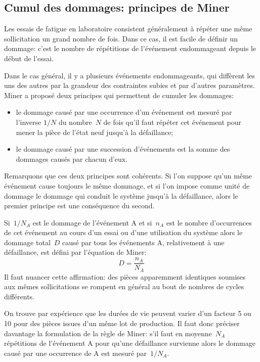 \medskip
\subsection{Cumul des dommages: principes de Miner}

\medskip
Les essais de fatigue en laboratoire consistent généralement à répéter une même
sollicitation un grand nombre de fois. Dans ce cas, il est facile de définir un dommage: c'est
le nombre de répétitions de l'événement endommageant depuis le début de l'essai.

Dans le cas général, il y a plusieurs événements endommageants, qui diffèrent les uns
des autres par la grandeur des contraintes subies et par d'autres paramètres. Miner a proposé
deux principes qui permettent de cumuler les dommages:
\begin{itemize}
  \item le dommage causé par une occurrence d'un événement est mesuré par l'inverse
	$1/N$ du nombre~$N$ de fois qu'il faut répéter cet événement pour mener la pièce de
	l'état neuf jusqu'à la défaillance;
  \item le dommage causé par une succession d'événements est la somme des dommages
	causés par chacun d'eux.
\end{itemize}

\medskip
Remarquons que ces deux principes sont cohérents. Si l'on suppose qu'un même événement
cause toujours le même dommage, et si l'on impose comme unité de dommage le dommage qui
conduit le système jusqu'à la défaillance, alors le premier principe est une conséquence du second.

Si~$1 / N_A$ est le dommage de l'événement A et si~$n_A$ est le nombre d'occurrences de cet
événement au cours d'un essai ou d'une utilisation du système alors le dommage total~$D$
causé par tous les événements A, relativement à une défaillance, est défini par l'équation
de Miner:
\begin{equation} D = \frac{n_A}{N_A} \end{equation}
\medskipvm
{}
Il faut nuancer cette affirmation: des pièces apparemment identiques soumises aux mêmes
sollicitations se rompent en général au bout de nombres de cycles différents.

On trouve par expérience que les durées de vie
peuvent varier d'un facteur 5 ou 10 pour des pièces issues d'un même lot de production.
Il faut donc préciser davantage la formulation de la règle de Miner:
s'il faut en moyenne~$N_A$ répétitions de l'événement A pour qu'une défaillance survienne
alors le dommage causé par une occurrence de A est mesuré par~$1 / N_A$.

